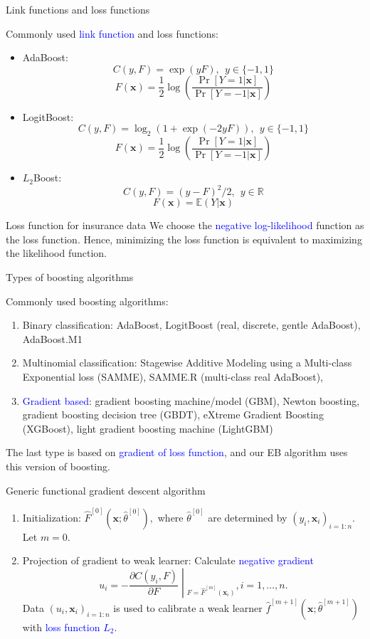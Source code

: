 \documentclass[professionalfont]{beamer}
\newcounter{saveenumi}
\newcommand{\seti}{\setcounter{saveenumi}{\value{enumi}}}
\def\R{{\mathbb R}}  %
\def\E{{\mathbb E}}  %
\def\bx{\boldsymbol{x}}
\newcommand{\blue}[1]{\textcolor{blue}{#1}}
\begin{document}
\begin{frame}{Link functions and loss functions}

	Commonly used \blue{link function} and loss functions:
	\begin{itemize}
		\item AdaBoost: $$C(y,F)=\exp(yF),  ~~ y\in\{-1,1\}$$
		$$F(\bx)=\frac{1}{2}\log\left(\frac{\Pr[Y=1|\bx]}{\Pr[Y=-1|\bx]}\right)$$
		\item LogitBoost: $$C(y,F)=\log_2(1+\exp(-2yF)), ~~ y\in\{-1,1\}$$
		$$F(\bx)=\frac{1}{2}\log\left(\frac{\Pr[Y=1|\bx]}{\Pr[Y=-1|\bx]}\right)$$
		\item $L_2$Boost: $$C(y,F)=(y-F)^2/2, ~~ y\in \R$$
		$$F(\bx)=\E(Y|\bx)$$
	\end{itemize}
\end{frame}

\begin{frame}{Loss function for insurance data}
	We choose the \blue{negative log-likelihood} function as the loss function. Hence, minimizing the loss function is equivalent to maximizing the likelihood function.
\end{frame}

\begin{frame}{Types of boosting algorithms}

Commonly used boosting algorithms:
	\begin{enumerate}
		
		\item Binary classification: {AdaBoost}, LogitBoost (real, discrete, gentle AdaBoost), AdaBoost.M1
		
		\item Multinomial classification: Stagewise Additive Modeling using a Multi-class Exponential loss (SAMME), SAMME.R (multi-class real AdaBoost), 
		\item \blue{Gradient based}: {gradient boosting machine/model (GBM)}, Newton boosting, gradient boosting decision tree (GBDT), {eXtreme Gradient Boosting (XGBoost)}, {light gradient boosting machine (LightGBM)}
	\end{enumerate}  

The last type is based on \blue{gradient of loss function}, and our EB algorithm uses this version of boosting.
\end{frame}

\begin{frame}{Generic functional gradient descent algorithm}	
	\begin{enumerate}
		\item Initialization: $\hat{F}^{[0]}(\bx;\hat{\theta}^{[0]}),$ where $\hat{\theta}^{[0]}$ are determined by $(y_i,\bx_i)_{i=1:n}$.
		Let $m=0.$
		\item Projection of gradient to weak learner:
		Calculate \blue{negative gradient} $$u_i=\left.-\frac{\partial C(y_i,F)}{\partial F}\middle|_{F=\hat{F}^{[m]}(\bx_i)}\right., i=1,\ldots,n.$$
		Data $(u_i,\bx_i)_{i=1:n}$ is used to calibrate a weak learner $\hat{f}^{[m+1]}(\bx;\hat{\theta}^{[m+1]})$ with \blue{loss function $L_2$}.
		\seti
\end{enumerate}
\end{frame}
\end{document}
